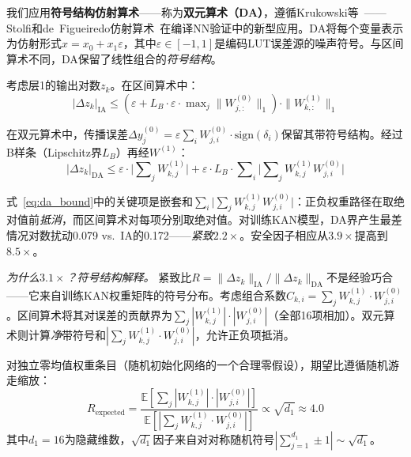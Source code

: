 \documentclass[journal,onecolumn]{IEEEtran}
\theoremstyle{definition}
\theoremstyle{plain}
\theoremstyle{remark}
\begin{document}
我们应用\textbf{符号结构仿射算术}——称为\textbf{双元算术（DA）}，遵循Krukowski等~\cite{krukowski2024doubleton}——Stolfi和de~Figueiredo仿射算术~\cite{stolfi2003affine}在编译NN验证中的新型应用。DA将每个变量表示为仿射形式$x = x_0 + x_1\varepsilon$，其中$\varepsilon \in [-1,1]$是编码LUT误差源的噪声符号。与区间算术不同，DA保留了线性组合的\textit{符号结构}。

考虑层1的输出对数$z_k$。在区间算术中：
\begin{equation}
|\Delta z_k|_{\text{IA}} \leq (\varepsilon + L_B \cdot \varepsilon \cdot \max\nolimits_j\|W^{(0)}_{j,:}\|_1) \cdot \|W^{(1)}_{k,:}\|_1
\end{equation}

在双元算术中，传播误差$\Delta y^{(0)}_j = \varepsilon \sum_i W^{(0)}_{j,i} \cdot \text{sign}(\delta_i)$保留其带符号结构。经过B样条（Lipschitz界$L_B$）再经$W^{(1)}$：
\begin{equation}
|\Delta z_k|_{\text{DA}} \leq \varepsilon \cdot \bigl|\sum\nolimits_j W^{(1)}_{k,j}\bigr| + \varepsilon \cdot L_B \cdot \sum\nolimits_i \bigl|\sum\nolimits_j W^{(1)}_{k,j} W^{(0)}_{j,i}\bigr|
\label{eq:da_bound}
\end{equation}

式~\ref{eq:da_bound}中的关键项是嵌套和$\sum_i \bigl|\sum_j W^{(1)}_{k,j} W^{(0)}_{j,i}\bigr|$：正负权重路径在取绝对值前\textit{抵消}，而区间算术对每项分别取绝对值。对训练KAN模型，DA界产生最差情况对数扰动0.079 vs.\ IA的0.172——\textit{紧致$2.2\times$}。安全因子相应从$3.9\times$提高到$8.5\times$。

\vspace{4pt}
\noindent\textit{为什么$3.1\times$？符号结构解释。}
紧致比$R = \|\Delta z_k\|_{\text{IA}} / \|\Delta z_k\|_{\text{DA}}$不是经验巧合——它来自训练KAN权重矩阵的符号分布。考虑组合系数$C_{k,i} = \sum_j W^{(1)}_{k,j} \cdot W^{(0)}_{j,i}$。区间算术将其对误差的贡献界为$\sum_j |W^{(1)}_{k,j}| \cdot |W^{(0)}_{j,i}|$（全部16项相加）。双元算术则计算\textit{净}带符号和$|\sum_j W^{(1)}_{k,j} \cdot W^{(0)}_{j,i}|$，允许正负项抵消。

对独立零均值权重条目（随机初始化网络的一个合理零假设），期望比遵循随机游走缩放：
\begin{equation}
R_{\text{expected}} = \frac{\mathbb{E}[\sum_j |W^{(1)}_{k,j}| \cdot |W^{(0)}_{j,i}|]}{\mathbb{E}[|\sum_j W^{(1)}_{k,j} \cdot W^{(0)}_{j,i}|]} \propto \sqrt{d_1} \approx 4.0
\label{eq:da_random_walk}
\end{equation}
其中$d_1 = 16$为隐藏维数，$\sqrt{d_1}$因子来自对对称随机符号$|\sum_{j=1}^{d_1} \pm 1| \sim \sqrt{d_1}$。
\end{document}
